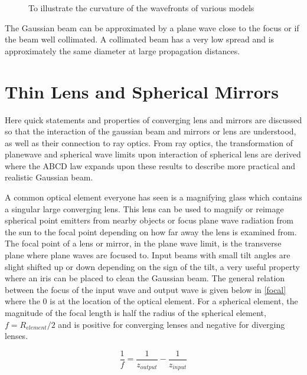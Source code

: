 \documentclass[11pt,a4paper]{book}
\newcommand{\imginput}[1]{} %
\begin{document}
			\begin{figure} [!ht]
				\centering
				\def\svgwidth{\columnwidth}
				\resizebox{16cm}{!}{\imginput{images/wavefront.pdf_tex}}
				\caption{To illustrate the curvature of the wavefronts of various models} 
				\label{fig:wavefront}
			\end{figure}	
			
			The Gaussian beam can be approximated by a plane wave close to the focus or if the beam well collimated. 
			A collimated beam has a very low spread and is approximately the same diameter at large propagation distances. 	
			
	\section{Thin Lens and Spherical Mirrors}
		\label{sec:Thin Lens and Spherical Mirrors}
		Here quick statements and properties of converging lens and mirrors are discussed so that the interaction of the gaussian beam and mirrors or lens are understood, as well as their connection to ray optics. From ray optics, the transformation of planewave and spherical wave limits upon interaction of spherical lens are derived where the ABCD law expands upon these results to describe more practical and realistic Gaussian beam.
		
		A common optical element everyone has seen is a magnifying glass which contains a singular large converging lens. 
		This lens can be used to magnify or reimage spherical point emitters from nearby objects or focus plane wave radiation from the sun to the focal point depending on how far away the lens is examined from.
		The focal point of a lens or mirror, in the plane wave limit, is the transverse plane where plane waves are focused to. 
		Input beams with small tilt angles are slight shifted up or down depending on the sign of the tilt, a very useful property where an iris can be placed to clean the Gaussian beam. 
		The general relation between the focus of the input wave and output wave is given below in \autoref{focal} where the 0 is at the location of the optical element. 
		For a spherical element, the magnitude of the focal length is half the radius of the spherical element, $f=R_{element}/2$ and is positive for converging lenses and negative for diverging lenses.
		
		\begin{equation}\label{focal}
			\frac{1}{f}=\frac{1}{z_{output}}-\frac{1}{z_{input}}
		\end{equation}
\end{document}
